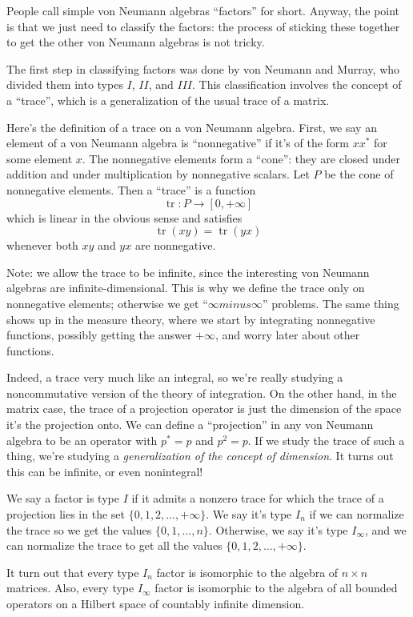 \documentclass{article}
\begin{document}
People call simple von Neumann algebras ``factors'' for short. Anyway,
the point is that we just need to classify the factors: the process of
sticking these together to get the other von Neumann algebras is not
tricky.

The first step in classifying factors was done by von Neumann and
Murray, who divided them into types \(I\), \(II\), and \(III\). This
classification involves the concept of a ``trace'', which is a
generalization of the usual trace of a matrix.

Here's the definition of a trace on a von Neumann algebra. First, we say
an element of a von Neumann algebra is ``nonnegative'' if it's of the
form \(xx^*\) for some element \(x\). The nonnegative elements form a
``cone'': they are closed under addition and under multiplication by
nonnegative scalars. Let \(P\) be the cone of nonnegative elements. Then
a ``trace'' is a function \[\operatorname{tr}\colon P \to [0, +\infty]\]
which is linear in the obvious sense and satisfies
\[\operatorname{tr}(xy) = \operatorname{tr}(yx)\] whenever both \(xy\)
and \(yx\) are nonnegative.

Note: we allow the trace to be infinite, since the interesting von
Neumann algebras are infinite-dimensional. This is why we define the
trace only on nonnegative elements; otherwise we get
``\(\infty minus \infty\)'' problems. The same thing shows up in the
measure theory, where we start by integrating nonnegative functions,
possibly getting the answer \(+\infty\), and worry later about other
functions.

Indeed, a trace very much like an integral, so we're really studying a
noncommutative version of the theory of integration. On the other hand,
in the matrix case, the trace of a projection operator is just the
dimension of the space it's the projection onto. We can define a
``projection'' in any von Neumann algebra to be an operator with
\(p^* = p\) and \(p^2 = p\). If we study the trace of such a thing,
we're studying a \emph{generalization of the concept of dimension}. It
turns out this can be infinite, or even nonintegral!

We say a factor is type \(I\) if it admits a nonzero trace for which the
trace of a projection lies in the set \(\{0,1,2,\ldots,+\infty\}\). We
say it's type \(I_n\) if we can normalize the trace so we get the values
\(\{0,1,\ldots,n\}\). Otherwise, we say it's type \(I_\infty\), and we
can normalize the trace to get all the values
\(\{0,1,2,\ldots,+\infty\}\).

It turn out that every type \(I_n\) factor is isomorphic to the algebra
of \(n\times n\) matrices. Also, every type \(I_\infty\) factor is
isomorphic to the algebra of all bounded operators on a Hilbert space of
countably infinite dimension.
\end{document}

